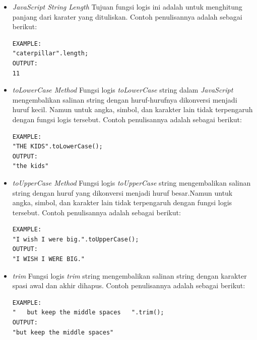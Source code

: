     \begin{itemize}
        \item \textit{JavaScript String Length}\newline
        Tujuan fungsi logis ini adalah untuk menghitung panjang dari karater yang dituliskan. Contoh penulisannya adalah sebagai berikut: 
        \begin{lstlisting}[basicstyle=\ttfamily, frame=single,
        columns=fullflexible, breaklines=true, numbers=none]
EXAMPLE:
"caterpillar".length;
OUTPUT:
11
        \end{lstlisting}
        \item \textit{toLowerCase Method}\newline
        Fungsi logis \textit{toLowerCase} string dalam \textit{JavaScript} mengembalikan salinan string dengan huruf-hurufnya dikonversi menjadi huruf kecil. Namun untuk angka, simbol, dan karakter lain tidak terpengaruh dengan fungsi logis tersebut. Contoh penulisannya adalah sebagai berikut: 
         \begin{lstlisting}[basicstyle=\ttfamily, frame=single,
    columns=fullflexible, breaklines=true, numbers=none]
EXAMPLE:
"THE KIDS".toLowerCase();
OUTPUT:
"the kids"
        \end{lstlisting}
        \item \textit{toUpperCase Method}\newline
        Fungsi logis \textit{toUpperCase} string mengembalikan salinan string dengan huruf yang dikonversi menjadi huruf besar.Namun untuk angka, simbol, dan karakter lain tidak terpengaruh dengan fungsi logis tersebut. Contoh penulisannya adalah sebagai berikut: 
         \begin{lstlisting}[basicstyle=\ttfamily, frame=single,
    columns=fullflexible, breaklines=true, numbers=none]
EXAMPLE:
"I wish I were big.".toUpperCase();
OUTPUT:
"I WISH I WERE BIG."
        \end{lstlisting}
        \item \textit{trim}\newline
        Fungsi logis \textit{trim} string mengembalikan salinan string dengan karakter spasi awal dan akhir dihapus. Contoh penulisannya adalah sebagai berikut: 
        \begin{lstlisting}[basicstyle=\ttfamily, frame=single,
        columns=fullflexible, breaklines=true, numbers=none]
EXAMPLE:
"   but keep the middle spaces   ".trim();
OUTPUT:
"but keep the middle spaces"
        \end{lstlisting}
    \end{itemize}
    
